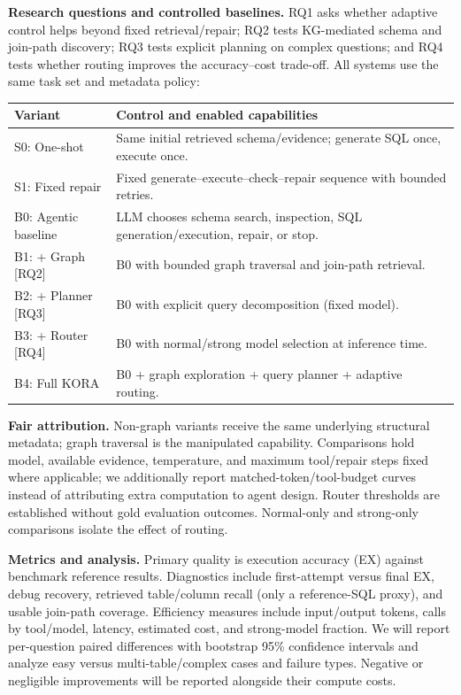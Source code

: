 \documentclass{article}
\begin{document}
\textbf{Research questions and controlled baselines.} RQ1 asks whether adaptive control helps beyond fixed retrieval/repair; RQ2 tests KG-mediated schema and join-path discovery; RQ3 tests explicit planning on complex questions; and RQ4 tests whether routing improves the accuracy--cost trade-off. All systems use the same task set and metadata policy:

\begin{table}[H]
\centering
\small
\begin{tabularx}{\linewidth}{@{}>{\raggedright\arraybackslash}p{3.1cm} X@{}}
\toprule
\textbf{Variant} & \textbf{Control and enabled capabilities} \\
\midrule
S0: One-shot & Same initial retrieved schema/evidence; generate SQL once, execute once. \\
S1: Fixed repair & Fixed generate--execute--check--repair sequence with bounded retries. \\
B0: Agentic baseline & LLM chooses schema search, inspection, SQL generation/execution, repair, or stop. \\
B1: + Graph [RQ2] & B0 with bounded graph traversal and join-path retrieval. \\
B2: + Planner [RQ3] & B0 with explicit query decomposition (fixed model). \\
B3: + Router [RQ4] & B0 with normal/strong model selection at inference time. \\
B4: Full KORA & B0 + graph exploration + query planner + adaptive routing. \\
\bottomrule
\end{tabularx}
\end{table}

\textbf{Fair attribution.} Non-graph variants receive the same underlying structural metadata; graph traversal is the manipulated capability. Comparisons hold model, available evidence, temperature, and maximum tool/repair steps fixed where applicable; we additionally report matched-token/tool-budget curves instead of attributing extra computation to agent design. Router thresholds are established without gold evaluation outcomes. Normal-only and strong-only comparisons isolate the effect of routing.

\textbf{Metrics and analysis.} Primary quality is execution accuracy (EX) against benchmark reference results. Diagnostics include first-attempt versus final EX, debug recovery, retrieved table/column recall (only a reference-SQL proxy), and usable join-path coverage. Efficiency measures include input/output tokens, calls by tool/model, latency, estimated cost, and strong-model fraction. We will report per-question paired differences with bootstrap 95\% confidence intervals and analyze easy versus multi-table/complex cases and failure types. Negative or negligible improvements will be reported alongside their compute costs.
\end{document}
